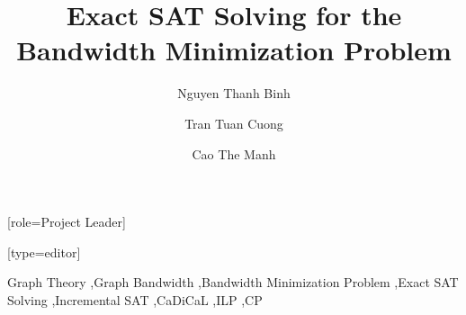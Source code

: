 \documentclass[a4paper,fleqn]{cas-sc}
\begin{document}
\let\WriteBookmarks\relax
\def\floatpagepagefraction{1}
\def\textpagefraction{.001}


\title [mode = title]{Exact SAT Solving for the Bandwidth Minimization Problem}

\author[1]{Nguyen Thanh Binh}[role=Project Leader]

\author[1]{Tran Tuan Cuong}[type=editor]

\author[1]{Cao The Manh}

\address[1]{Faculty of Computer Science, VNU University of Engineering and Technology (VNU-UET)}



\begin{keywords}
Graph Theory \sep Graph Bandwidth \sep Bandwidth Minimization Problem \sep Exact SAT Solving \sep Incremental SAT \sep CaDiCaL \sep ILP \sep CP
\end{keywords}

\maketitle











\bio{}
\endbio
\end{document}
